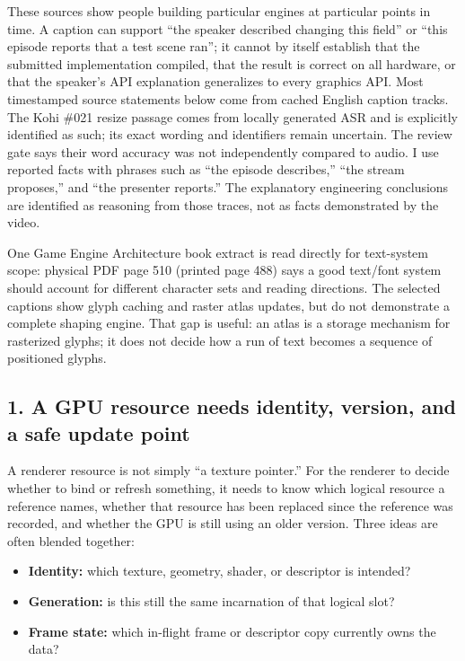 These sources show people building particular engines at particular points in time. A caption can support ``the speaker described changing this field'' or ``this episode reports that a test scene ran''; it cannot by itself establish that the submitted implementation compiled, that the result is correct on all hardware, or that the speaker's API explanation generalizes to every graphics API. Most timestamped source statements below come from cached English caption tracks. The Kohi \#021 resize passage comes from locally generated ASR and is explicitly identified as such; its exact wording and identifiers remain uncertain. The review gate says their word accuracy was not independently compared to audio. I use reported facts with phrases such as ``the episode describes,'' ``the stream proposes,'' and ``the presenter reports.'' The explanatory engineering conclusions are identified as reasoning from those traces, not as facts demonstrated by the video.

One Game Engine Architecture book extract is read directly for text-system scope: physical PDF page 510 (printed page 488) says a good text/font system should account for different character sets and reading directions. The selected captions show glyph caching and raster atlas updates, but do not demonstrate a complete shaping engine. That gap is useful: an atlas is a storage mechanism for rasterized glyphs; it does not decide how a run of text becomes a sequence of positioned glyphs.

\subsection{1. A GPU resource needs identity, version, and a safe update point}\label{06-engine-ii-ch041-a-gpu-resource-needs-identity-version-and-a-safe-update-point}

A renderer resource is not simply ``a texture pointer.'' For the renderer to decide whether to bind or refresh something, it needs to know which logical resource a reference names, whether that resource has been replaced since the reference was recorded, and whether the GPU is still using an older version. Three ideas are often blended together:

\begin{itemize}
\tightlist
\item
  \textbf{Identity:} which texture, geometry, shader, or descriptor is intended?
\item
  \textbf{Generation:} is this still the same incarnation of that logical slot?
\item
  \textbf{Frame state:} which in-flight frame or descriptor copy currently owns the data?
\end{itemize}

